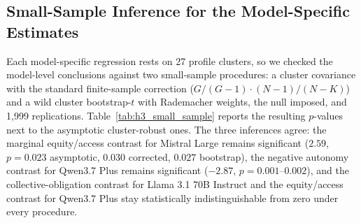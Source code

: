 \clearpage

\subsection{Small-Sample Inference for the Model-Specific Estimates}

Each model-specific regression rests on 27 profile clusters, so we checked the model-level conclusions against two small-sample procedures: a cluster covariance with the standard finite-sample correction ($G/(G-1)\cdot(N-1)/(N-K)$) and a wild cluster bootstrap-$t$ with Rademacher weights, the null imposed, and 1{,}999 replications. Table~\ref{tab:h3_small_sample} reports the resulting $p$-values next to the asymptotic cluster-robust ones. The three inferences agree: the marginal equity/access contrast for Mistral Large remains significant ($2.59$, $p=0.023$ asymptotic, $0.030$ corrected, $0.027$ bootstrap), the negative autonomy contrast for Qwen3.7 Plus remains significant ($-2.87$, $p=0.001$--$0.002$), and the collective-obligation contrast for Llama 3.1 70B Instruct and the equity/access contrast for Qwen3.7 Plus stay statistically indistinguishable from zero under every procedure.

